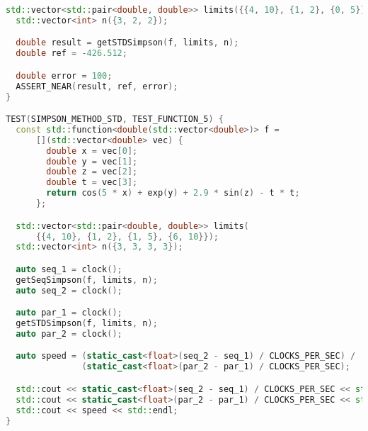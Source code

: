 \documentclass{report}
\begin{document}
\begin{lstlisting}[language=C++]
  std::vector<std::pair<double, double>> limits({{4, 10}, {1, 2}, {0, 5}});
  std::vector<int> n({3, 2, 2});

  double result = getSTDSimpson(f, limits, n);
  double ref = -426.512;

  double error = 100;
  ASSERT_NEAR(result, ref, error);
}

TEST(SIMPSON_METHOD_STD, TEST_FUNCTION_5) {
  const std::function<double(std::vector<double>)> f =
      [](std::vector<double> vec) {
        double x = vec[0];
        double y = vec[1];
        double z = vec[2];
        double t = vec[3];
        return cos(5 * x) + exp(y) + 2.9 * sin(z) - t * t;
      };

  std::vector<std::pair<double, double>> limits(
      {{4, 10}, {1, 2}, {1, 5}, {6, 10}});
  std::vector<int> n({3, 3, 3, 3});

  auto seq_1 = clock();
  getSeqSimpson(f, limits, n);
  auto seq_2 = clock();

  auto par_1 = clock();
  getSTDSimpson(f, limits, n);
  auto par_2 = clock();

  auto speed = (static_cast<float>(seq_2 - seq_1) / CLOCKS_PER_SEC) /
               (static_cast<float>(par_2 - par_1) / CLOCKS_PER_SEC);

  std::cout << static_cast<float>(seq_2 - seq_1) / CLOCKS_PER_SEC << std::endl;
  std::cout << static_cast<float>(par_2 - par_1) / CLOCKS_PER_SEC << std::endl;
  std::cout << speed << std::endl;
}
\end{lstlisting}
\end{document}
